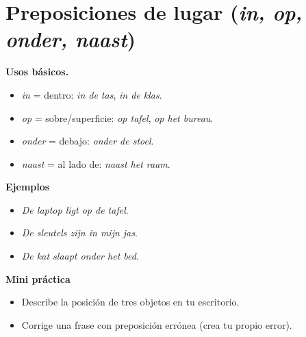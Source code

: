 \section{Preposiciones de lugar (\textit{in, op, onder, naast})}
\textbf{Usos básicos.}
\begin{itemize}[leftmargin=*]
  \item \textit{in} = dentro: \textit{in de tas}, \textit{in de klas}.
  \item \textit{op} = sobre/superficie: \textit{op tafel}, \textit{op het bureau}.
  \item \textit{onder} = debajo: \textit{onder de stoel}.
  \item \textit{naast} = al lado de: \textit{naast het raam}.
\end{itemize}

\textbf{Ejemplos}
\begin{itemize}[leftmargin=*]
  \item \textit{De laptop ligt op de tafel}.
  \item \textit{De sleutels zijn in mijn jas}.
  \item \textit{De kat slaapt onder het bed}.
\end{itemize}

\textbf{Mini práctica}
\begin{itemize}[leftmargin=*]
  \item Describe la posición de tres objetos en tu escritorio.
  \item Corrige una frase con preposición errónea (crea tu propio error).
\end{itemize}
